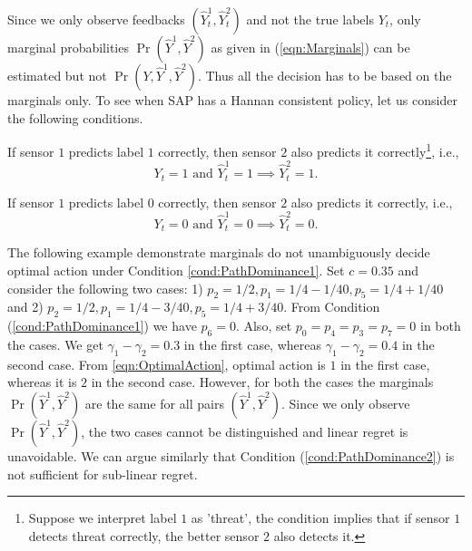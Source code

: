 \noindent
Since we only observe feedbacks $(\hat{Y}_t^1, \hat{Y}_t^2)$ and not the true labels $Y_t$, only marginal probabilities $\Pr(\hat{Y}^1, \hat{Y}^2)$ as given in (\ref{eqn:Marginals}) can be estimated but not $\Pr(Y, \hat{Y}^1, \hat{Y}^2)$. Thus all the decision has to be based on the marginals only. To see when SAP has a Hannan consistent policy, let us consider the following conditions.
\begin{condition}
	\label{cond:PathDominance1}
	 If sensor $1$ predicts label $1$ correctly, then sensor $2$ also predicts it correctly\footnote{Suppose we interpret label $1$ as 'threat', the condition implies that if sensor $1$ detects threat correctly, the better sensor $2$ also detects it. }, i.e.,
	 \begin{equation*}
	 \label{eqn:PathDominace1} 
	 Y_t=1 \mbox{ and } \hat{Y}_t^1=1 \implies \hat{Y}^2_t=1. 
	 \end{equation*}
\end{condition} 
\begin{condition}
		\label{cond:PathDominance2}
	If sensor $1$ predicts label $0$ correctly, then sensor $2$ also predicts it correctly, i.e.,
	\begin{equation*}
	\label{eqn:PathDominace2} 
	Y_t=0 \mbox{ and } \hat{Y}_t^1=0 \implies \hat{Y}^2_t=0. 
	\end{equation*}
\end{condition}
The following example demonstrate  marginals do not unambiguously decide optimal action under Condition \ref{cond:PathDominance1}.
Set $c=0.35$ and consider the following two cases: 1) $p_2=1/2, p_1=1/4-1/40, p_5=1/4+1/40$ and 2) $p_2=1/2, p_1=1/4-3/40,p_5=1/4+3/40$. From Condition (\ref{cond:PathDominance1}) we have $p_6=0$. Also, set $p_0=p_4=p_3=p_7=0$ in both the cases. We get $\gamma_1-\gamma_2=0.3$ in the first case,  whereas $\gamma_1-\gamma_2=0.4$ in the second case. From \ref{eqn:OptimalAction}, optimal action is $1$ in the first case, whereas it is  $2$ in the second case. However, for both the cases the marginals $\Pr(\hat{Y}^1, \hat{Y}^2)$ are the same for all pairs $(\hat{Y}^1, \hat{Y}^2)$. Since we only  observe $\Pr(\hat{Y}^1, \hat{Y}^2)$, the two cases cannot be distinguished and linear regret is unavoidable. We can argue similarly that Condition (\ref{cond:PathDominance2}) is not sufficient for sub-linear regret. 

